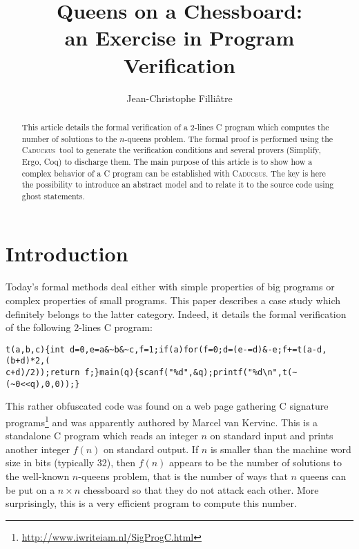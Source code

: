 \documentclass[a4paper]{llncs}
\newcommand{\caduceus}{\textsc{Caduceus}}
\begin{document}
\title{Queens on a Chessboard: \\
       an Exercise in Program Verification}
\author{Jean-Christophe Filli\^atre}
\maketitle

\begin{abstract}
  This article details the formal verification of a 2-lines C program
  which computes the number of solutions to the $n$-queens problem.
  The formal proof is performed using the \caduceus\ tool to generate
  the verification conditions and several provers (Simplify, Ergo,
  Coq) to discharge them. The main purpose of this article is to show
  how a complex behavior of a C program can be established with
  \caduceus. The key is here the possibility to introduce an abstract
  model and to relate it to the source code using ghost statements.
\end{abstract}

\section{Introduction}

Today's formal methods deal either with simple properties of big programs or
complex properties of small programs. This paper describes a case study
which definitely belongs to the latter category.
Indeed, it details the formal verification of the following 2-lines C program:
{\small%
\begin{verbatim}
t(a,b,c){int d=0,e=a&~b&~c,f=1;if(a)for(f=0;d=(e-=d)&-e;f+=t(a-d,(b+d)*2,(
c+d)/2));return f;}main(q){scanf("%d",&q);printf("%d\n",t(~(~0<<q),0,0));}
\end{verbatim}}
\noindent 
This rather obfuscated code was found on a web page gathering C signature
programs\footnote{\url{http://www.iwriteiam.nl/SigProgC.html}} and was
apparently authored by Marcel van Kervinc. This is a standalone C program
which reads an integer $n$ on standard input and prints another
integer $f(n)$ on standard output. If $n$ is smaller than the
machine word size in bits (typically 32), then
$f(n)$ appears to be the number of solutions to the well-known $n$-queens
problem, that is the number of ways that $n$ queens can be put on a $n\times n$
chessboard so that they do not attack each other. More
surprisingly, this is a very efficient program to compute this number.
\end{document}
